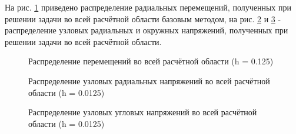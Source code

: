 \documentclass[a4paper, 14pt]{extarticle}
\newcommand{\area}{rectangle}
\newcommand{\task}{3_fixes}
\newcommand{\taskNum}{01}
\begin{document}
\newpage

\renewcommand{\area}{thick_walled_cylinder}
\renewcommand{\task}{pressure_only}
\renewcommand{\taskNum}{03}

На рис. \ref{fig:task_\taskNum_basic_displacement_distribution} приведено распределение радиальных перемещений, полученных при решении задачи во всей расчётной области базовым методом, на рис. \ref{fig:task_\taskNum_basic_pressure_distribution_r} и \ref{fig:task_\taskNum_basic_pressure_distribution_phi} - распределение узловых радиальных и окружных напряжений, полученных при решении задачи во всей расчётной области.

\begin{figure}[h]
\caption{Распределение перемещений во всей расчётной области (h = 0.125)}
\label{fig:task_\taskNum_basic_displacement_distribution}
\end{figure}

\newpage

\begin{figure}[H]
\caption{Распределение узловых радиальных напряжений во всей расчётной области (h = 0.0125)}
\label{fig:task_\taskNum_basic_pressure_distribution_r}
\end{figure}
\begin{figure}[H]
\caption{Распределение узловых угловых напряжений во всей расчётной области (h = 0.0125)}
\label{fig:task_\taskNum_basic_pressure_distribution_phi}
\end{figure}
\end{document}
